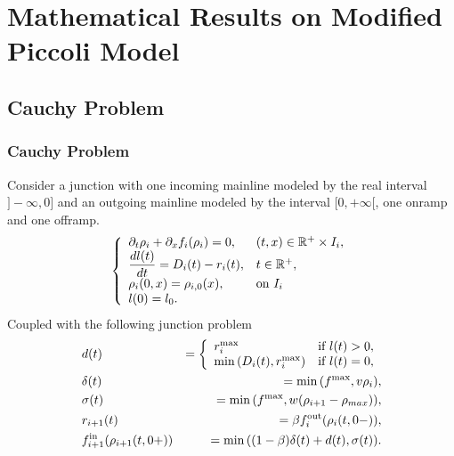 \section{Mathematical Results on Modified Piccoli Model}
\subsection{Cauchy Problem}
\begin{frame}[fragile]
\frametitle{Cauchy Problem}
Consider a junction with one incoming mainline modeled by the real interval $]-\infty,0]$ and an outgoing mainline modeled by the interval $[0,+\infty[$, one onramp and one offramp. 
\begin{equation}
	\label{eq:CP}
		\left\{
		\begin{array}{ll}
		\partial_t \rho_i + \partial_x f_i(\rho_i) =0, & (t,x)\in\mathbb R^+\times I_i, \\
		\dfrac{dl(t)}{dt}=D_i(t)-r_i(t), & t\in\mathbb R^+ ,\\
		\rho_i(0,x)=\rho_{i,0}(x), & \text{on } I_i \\
		l(0)=l_0.
		\end{array}
		\right.
\end{equation}
Coupled with the following junction problem
\begin{eqnarray}
 	\label{eq:JunctionProblem}
		&d(t)&=\left\{
			 \begin{array}{ll}
			 r^{\max}_i &\hbox{if}~l(t)>0 , \\ 
			 \min{(D_i(t), r^{\max}_i)} &\hbox{if}~l(t)=0,
			 \end{array}
			 \right.\\ \nonumber
		&\delta(t)&=\min{(f^{\max},v\rho_i)},	 \\ \nonumber
		&\sigma(t)&=\min{(f^{\max},w(\rho_{i+1} - \rho_{max}))},\\ \nonumber
		&r_{i+1}(t)&=\beta f^{\text{out}}_i(\rho_i(t,0-)),	\\ \nonumber	
		&f^{\text{in}}_{i+1}(\rho_{i+1}(t,0+))&=\min{((1-\beta)\delta(t)+d(t), \sigma(t))}.
\end{eqnarray}

\end{frame}

